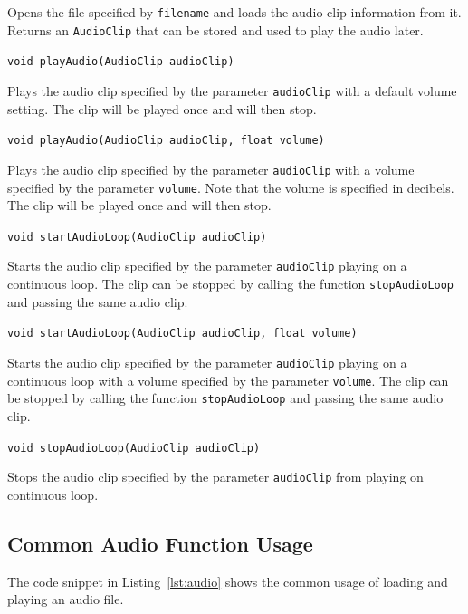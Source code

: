 \documentclass[a4paper, 10pt]{report}
\begin{document}
Opens the file specified by {\tt filename} and loads the audio clip information from it. Returns an {\tt AudioClip} that can be stored and used to play the audio later.

\hrulefill

{\large {\tt void playAudio(AudioClip audioClip)}}

Plays the audio clip specified by the parameter {\tt audioClip} with a default volume setting. The clip will be played once and will then stop.

\hrulefill

{\large {\tt void playAudio(AudioClip audioClip, float volume)}}

Plays the audio clip specified by the parameter {\tt audioClip} with a volume specified by the parameter {\tt volume}. Note that the volume is specified in decibels. The clip will be played once and will then stop.

\hrulefill

{\large {\tt void startAudioLoop(AudioClip audioClip)}}

Starts the audio clip specified by the parameter {\tt audioClip} playing on a continuous loop. The clip can be stopped by calling the function {\tt stopAudioLoop} and passing the same audio clip.

\hrulefill

{\large {\tt void startAudioLoop(AudioClip audioClip, float volume)}}

Starts the audio clip specified by the parameter {\tt audioClip} playing on a continuous loop with a volume specified by the parameter {\tt volume}. The clip can be stopped by calling the function {\tt stopAudioLoop} and passing the same audio clip.

\hrulefill

{\large {\tt void stopAudioLoop(AudioClip audioClip)}}

Stops the audio clip specified by the parameter {\tt audioClip} from playing on continuous loop.

\subsection*{Common Audio Function Usage} \nonumber

The code snippet in Listing~\ref{lst:audio} shows the common usage of loading and playing an audio file.
\end{document}
